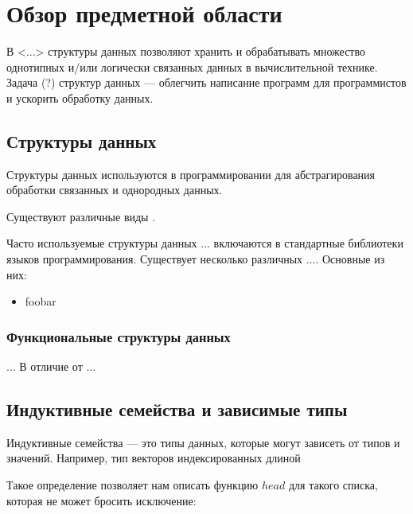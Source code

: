 \chapter{Обзор предметной области}
\label{chapter1}

В <...> структуры данных позволяют хранить и обрабатывать множество однотипных 
и/или логически связанных данных в вычислительной технике.
Задача (?) структур данных — облегчить написание программ для программистов и
ускорить обработку данных.

\section{Структуры данных}
Структуры данных используются в программировании для абстрагирования
обработки связанных и однородных данных.

Существуют различные виды 
. 

Часто используемые структуры данных ... включаются в стандартные библиотеки
языков программирования.
Существует несколько различных .... Основные из них:
\begin{itemize}
 \item foobar
\end{itemize}

\subsection{Функциональные структуры данных}
...
В отличие от ...



\section{Индуктивные семейства и зависимые типы}

Индуктивные семейства — это типы данных, которые могут зависеть от типов и значений. Например, тип векторов индексированных длиной 



Такое определение позволяет нам описать функцию $ head $ для такого списка, которая не может бросить исключение:

% 

